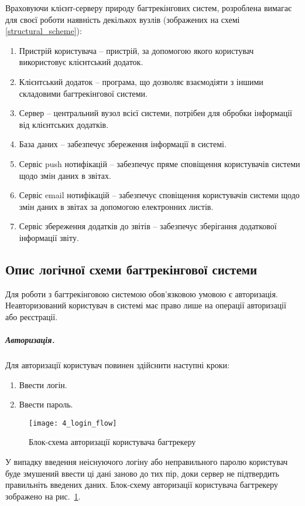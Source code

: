 \documentclass[../main.tex]{subfiles}
\begin{document}
		Враховуючи клієнт-серверу природу багтрекінгових систем, розроблена вимагає для своєї роботи наявність декількох вузлів (зображених на схемі \ref{structural_scheme}):
		\begin{enumerate}
			\item Пристрій користувача -- пристрій, за допомогою якого користувач використовує клієнтський додаток.
			\item Клієнтський додаток -- програма, що дозволяє взаємодіяти з іншими складовими багтрекінгової системи.
			\item Сервер -- центральний вузол всієї системи, потрібен для обробки інформації від клієнтських додатків.
			\item База даних -- забезпечує збереження інформації в системі.
			\item Сервіс push нотифікацій -- забезпечує пряме сповіщення користувачів системи щодо змін даних в звітах.
			\item Сервіс email нотифікацій -- забезпечує сповіщення користувачів системи щодо змін даних в звітах за допомогою електронних листів.
			\item Сервіс збереження додатків до звітів -- забезпечує зберігання додаткової інформації звіту.
		\end{enumerate}
	
	\subsection{Опис логічної схеми багтрекінгової системи}
		Для роботи з багтрекінговою системою обов'язковою умовою є авторизація. Неавторизований користувач в системі має право лише на операції авторизації або реєстрації.
		
		\subparagraph{Авторизація.}
			Для авторизації користувач повинен здійснити наступні кроки:
			\begin{enumerate}
				\item Ввести логін.
				\item Ввести пароль.
			\end{enumerate}

			\begin{figure}[H]
				\centering
				\texttt{[image: 4\_login\_flow]}
				\caption{Блок-схема авторизації користувача багтрекеру}
				\label{flowchart_login}
			\end{figure}

			У випадку введення неіснуючого логіну або неправильного паролю користувач буде змушений ввести ці дані заново до тих пір, доки сервер не підтвердить правильніть введених даних. Блок-схему авторизації користувача багтрекеру зображено на рис.~\ref{flowchart_login}.
		
\end{document}
